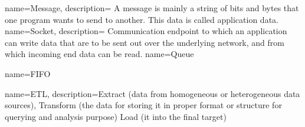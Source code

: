{
    name=Message,
    description={
        A message is mainly a string of bits and bytes that one program 
        wants to send to another. This data is called application data.  
    }
}
{
    name=Socket,
    description={
        Communication endpoint to which an application can write data
        that are to be sent out over the underlying network, and from which incoming end
        data can be read. \cite{TAN06}
    }
}
{
    name=Queue
}

{
    name=FIFO
}

{
    name=ETL,
    description={Extract (data from homogeneous or heterogeneous data sources), 
         Transform (the data for storing it in proper format or structure
         for querying and analysis purpose)
         Load (it into the final target)
    }
}

